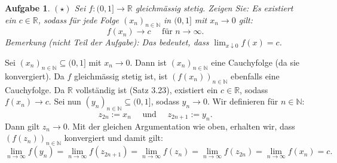 \documentclass[a4paper, 20]{exam}
\newtheorem{ex}{Aufgabe}
\newcommand\RR{\mathbb{R}}
\newcommand\NN{\mathbb{N}}
\begin{document}
\begin{ex}{$(\star)$}
Sei $f:(0,1] \longrightarrow \RR$ gleichm\"assig stetig.
Zeigen Sie: Es existiert ein $c\in \RR$, sodass f\"ur jede Folge $(x_n)_{n\in \NN}$ in $(0,1]$ mit $x_n \longrightarrow 0$ gilt:
$$ f(x_n) \longrightarrow c  \quad \text{ f\"ur } n \longrightarrow \infty.$$
Bemerkung (nicht Teil der Aufgabe): Das bedeutet, dass $\lim_{x \downarrow 0}f(x) = c$.
\end{ex}
\begin{solution}
Sei $(x_n)_{n \in \NN}\subseteq (0,1]$ mit $x_n \longrightarrow 0$. Dann ist $(x_n)_{n \in \NN}$ eine Cauchyfolge (da sie konvergiert). Da $f$ gleichm\"assig stetig ist, ist $(f(x_n))_{n\in \NN}$ ebenfalls eine Cauchyfolge. Da $\RR$ vollst\"andig ist (Satz 3.23), existiert ein $c\in \RR$, sodass $f(x_n) \longrightarrow c$. Sei nun $(y_n)_{n\in \NN}\subseteq (0,1]$, sodass $y_n \longrightarrow 0$. Wir definieren f\"ur $n\in \NN$:
$$z_{2n}:=x_n \quad \text{ und } \quad z_{2n+1}:= y_n.$$
Dann gilt $z_n \longrightarrow 0$. Mit der gleichen Argumentation wie oben, erhalten wir, dass $(f(z_n))_{n\in \NN}$ konvergiert und damit gilt:
$$\lim_{n \rightarrow \infty} f(y_n) = \lim_{n \rightarrow \infty} f(z_{2n+1})
= \lim_{n \rightarrow \infty} f(z_n) = \lim_{n \rightarrow \infty} f(z_{2n})
= \lim_{n \rightarrow \infty} f(x_n) = c.$$
\end{solution}
\end{document}
